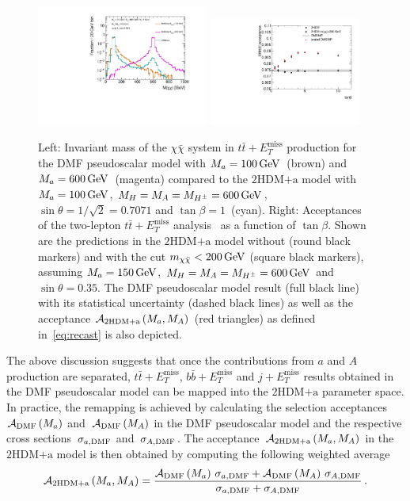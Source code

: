 \documentclass[a4paper, 11pt,notoc]{article}
\newcommand{\MET}{\ensuremath{E_T^\mathrm{miss}}\xspace}
\newcommand{\mA}{\ensuremath{M_{A}}\xspace}
\newcommand{\ma}{\ensuremath{M_{a}}\xspace}
\newcommand{\mH}{\ensuremath{M_{H}}\xspace}
\newcommand{\mHc}{\ensuremath{M_{H^{\pm}}}\xspace}
\newcommand{\hdma}{\ensuremath{\textrm{2HDM+a}}\xspace}
\begin{document}
\begin{figure}[t!]
\centering
\includegraphics[width=0.5\textwidth]{mchichi.pdf}
\includegraphics[width=0.45\textwidth]{plotacc_tb.pdf}
\vspace{2mm}
\caption{ \label{fig:mchichi_DMsimpV2HDMa}
Left: Invariant mass of the $\chi\bar{\chi}$ system in $t \bar t + \MET$ production for the DMF pseudoscalar model with $\ma =100 \, {\rm  GeV}$~(brown) and $\ma =600 \, {\rm  GeV}$~(magenta) compared to the \hdma model with $\ma = 100 \, {\rm  GeV}$, $\mH = \mA = \mHc = 600 \, {\rm  GeV}$, $\sin\theta=1/\sqrt{2}=0.7071$ and $\tan\beta=1$~(cyan). Right: Acceptances of the   two-lepton $t \bar t + \MET$ analysis~\cite{Aaboud:2017rzf}  as a function of $\tan\beta$.  Shown are the predictions in the \hdma model without (round black markers) and with the cut $m_{\chi \bar \chi} <200 \, {\rm GeV}$ (square black markers), assuming $\ma = 150 \, {\rm GeV}$, $\mH= \mA = \mHc = 600 \, {\rm GeV}$ and $\sin\theta=0.35$. The DMF pseudoscalar model result (full black line) with its statistical uncertainty (dashed black lines) as well as the acceptance  ${\cal A}_{\hdma} \left (\ma, \mA \right )$ (red triangles) as defined in~\eqref{eq:recast} is also depicted.}
\end{figure}

The above discussion suggests that once the contributions from $a$ and $A$ production are separated, $t \bar t + \MET$, $b \bar b + \MET$ and $j + \MET$  results obtained in the DMF pseudoscalar model can be mapped into the $\hdma$ parameter space. In practice, the remapping is achieved by calculating the selection acceptances~${\cal A}_{\rm DMF} \left ( \ma \right )$ and~${\cal A}_{\rm DMF} \left ( \mA \right )$ in the DMF pseudoscalar model and the respective cross sections~$\sigma_{a, {\rm DMF}}$ and~$\sigma_{A, {\rm DMF}}$. The acceptance~${\cal A}_{\hdma} \left (\ma, \mA \right )$ in the \hdma model  is then obtained by computing the following weighted average
\begin{equation} \label{eq:recast}
{\cal A}_{\hdma} \left (\ma, \mA \right )=\frac{ {\cal A}_{\rm DMF} \left ( \ma \right )\, \sigma_{a, {\rm DMF}} + {\cal A}_{\rm DMF} \left ( \mA \right ) \, \sigma_{A, {\rm DMF}} }{\sigma_{a, {\rm DMF}}+\sigma_{A, {\rm DMF}}} \,.
\end{equation}
\end{document}
